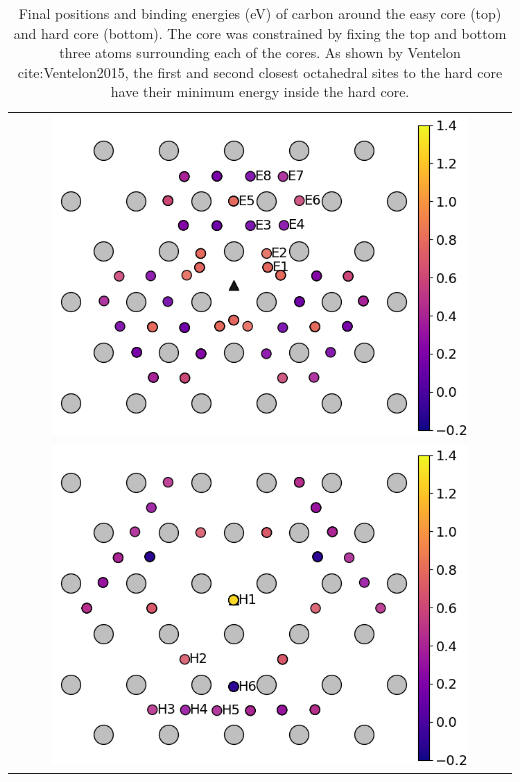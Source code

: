 \documentclass[a4paper]{article}
\begin{document}
{\begin{table}	
    \begin{tabular}{c}
 	          \includegraphics[width=0.85\textwidth]{../Images/easy_core_fe_C_positioning_energies.png}  \\
 	          \includegraphics[width=0.85\textwidth]{../Images/hard_core_fe_C_positioning_energies.png}  \\

     	     \end{tabular}		
\caption{ Final positions and binding energies (eV) of carbon around the easy core (top) and hard core (bottom). The core was constrained by fixing the top and bottom three atoms surrounding each of the cores. As shown by Ventelon cite:Ventelon2015, the first and second closest octahedral sites to the hard core have their minimum energy inside the hard core. }
   \end{table}


}
\end{document}
